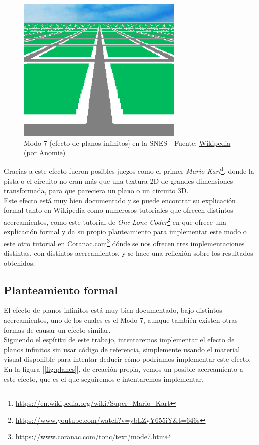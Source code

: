 \begin{figure}[h]
	\centering
	\includegraphics[width=8cm]{archivos/mode7}
	\caption{Modo 7 (efecto de planos infinitos) en la SNES - Fuente: \href{https://en.wikipedia.org/wiki/Mode_7\#/media/File:Mode_7_Test-0000.png}{Wikipedia (por Anomie)}}
	\label{fig:mode7}
\end{figure}

Gracias a este efecto fueron posibles juegos como el primer \emph{Mario Kart}\footnote{\url{https://en.wikipedia.org/wiki/Super_Mario_Kart}}, donde la pista o el circuito no eran más que una textura 2D de grandes dimensiones transformada, para que pareciera un plano o un circuito 3D.\\

Este efecto está muy bien documentado y se puede encontrar su explicación formal tanto en Wikipedia como numerosos tutoriales que ofrecen distintos acercamientos, como este tutorial de \emph{One Lone Coder}\footnote{\url{https://www.youtube.com/watch?v=ybLZyY655iY&t=646s}} en que ofrece una explicación formal y da su propio planteamiento para implementar este modo o este otro tutorial en Coranac.com\footnote{\url{https://www.coranac.com/tonc/text/mode7.htm}} dónde se nos ofrecen tres implementaciones distintas, con distintos acercamientos, y se hace una reflexión sobre los resultados obtenidos.

\subsection{Planteamiento formal}

El efecto de planos infinitos está muy bien documentado, bajo distintos acercamientos, uno de los cuales es el Modo 7, aunque también existen otras formas de causar un efecto similar.\\

Siguiendo el espíritu de este trabajo, intentaremos implementar el efecto de planos infinitos sin usar código de referencia, simplemente usando el material visual disponible para intentar deducir cómo podríamos implementar este efecto. En la figura [\ref{fig:planes}], de creación propia, vemos un posible acercamiento a este efecto, que es el que seguiremos e intentaremos implementar.\\

